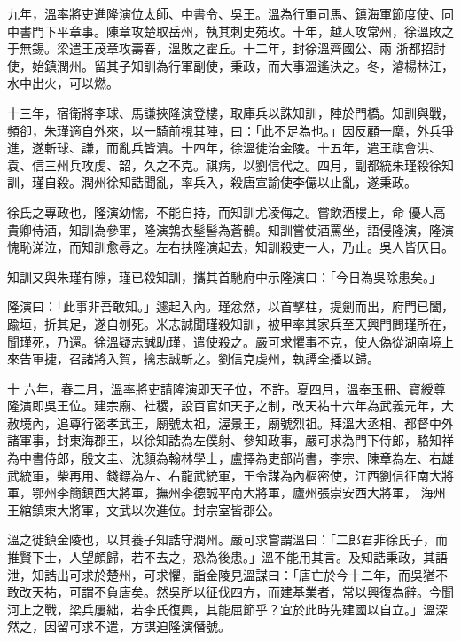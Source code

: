 \begin{pinyinscope}
 九年，溫率將吏進隆演位太師、中書令、吳王。溫為行軍司馬、鎮海軍節度使、同中書門下平章事。陳章攻楚取岳州，執其刺史苑玫。十年，越人攻常州，徐溫敗之于無錫。梁遣王茂章攻壽春，溫敗之霍丘。十二年，封徐溫齊國公、兩
 浙都招討使，始鎮潤州。留其子知訓為行軍副使，秉政，而大事溫遙決之。冬，濬楊林江，水中出火，可以燃。



 十三年，宿衛將李球、馬謙挾隆演登樓，取庫兵以誅知訓，陣於門橋。知訓與戰，頻卻，朱瑾適自外來，以一騎前視其陣，曰：「此不足為也。」因反顧一麾，外兵爭進，遂斬球、謙，而亂兵皆潰。十四年，徐溫徙治金陵。十五年，遣王祺會洪、袁、信三州兵攻虔、韶，久之不克。祺病，以劉信代之。四月，副都統朱瑾殺徐知訓，瑾自殺。潤州徐知誥聞亂，率兵入，殺唐宣諭使李儼以止亂，遂秉政。



 徐氏之專政也，隆演幼懦，不能自持，而知訓尤凌侮之。嘗飲酒樓上，命
 優人高貴卿侍酒，知訓為參軍，隆演鶉衣髽髻為蒼鶻。知訓嘗使酒罵坐，語侵隆演，隆演愧恥涕泣，而知訓愈辱之。左右扶隆演起去，知訓殺吏一人，乃止。吳人皆仄目。



 知訓又與朱瑾有隙，瑾已殺知訓，攜其首馳府中示隆演曰：「今日為吳除患矣。」



 隆演曰：「此事非吾敢知。」遽起入內。瑾忿然，以首擊柱，提劍而出，府門已闔，踰垣，折其足，遂自刎死。米志誠聞瑾殺知訓，被甲率其家兵至天興門問瑾所在，聞瑾死，乃還。徐溫疑志誠助瑾，遣使殺之。嚴可求懼事不克，使人偽從湖南境上來告軍捷，召諸將入賀，擒志誠斬之。劉信克虔州，執譚全播以歸。



 十
 六年，春二月，溫率將吏請隆演即天子位，不許。夏四月，溫奉玉冊、寶綬尊隆演即吳王位。建宗廟、社稷，設百官如天子之制，改天祐十六年為武義元年，大赦境內，追尊行密孝武王，廟號太祖，渥景王，廟號烈祖。拜溫大丞相、都督中外諸軍事，封東海郡王，以徐知誥為左僕射、參知政事，嚴可求為門下侍郎，駱知祥為中書侍郎，殷文圭、沈顏為翰林學士，盧擇為吏部尚書，李宗、陳章為左、右雄武統軍，柴再用、錢鏢為左、右龍武統軍，王令謀為內樞密使，江西劉信征南大將軍，鄂州李簡鎮西大將軍，撫州李德誠平南大將軍，廬州張崇安西大將軍，
 海州王綰鎮東大將軍，文武以次進位。封宗室皆郡公。



 溫之徙鎮金陵也，以其養子知誥守潤州。嚴可求嘗謂溫曰：「二郎君非徐氏子，而推賢下士，人望頗歸，若不去之，恐為後患。」溫不能用其言。及知誥秉政，其語泄，知誥出可求於楚州，可求懼，詣金陵見溫謀曰：「唐亡於今十二年，而吳猶不敢改天祐，可謂不負唐矣。然吳所以征伐四方，而建基業者，常以興復為辭。今聞河上之戰，梁兵屢絀，若李氏復興，其能屈節乎？宜於此時先建國以自立。」溫深然之，因留可求不遣，方謀迫隆演僭號。




\end{pinyinscope}

